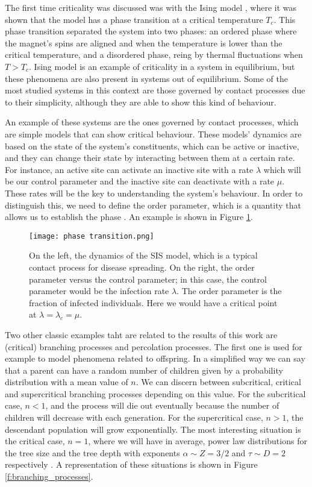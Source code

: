 The first time criticality was discussed was with the Ising model \cite{ising1925}, where it was shown that the model has a phase transition at a critical temperature $T_c$. This phase transition
separated the system into two phases: an ordered phase where the magnet's spins are aligned and when the temperature is lower than the critical temperature, and a disordered phase,
reing by thermal fluctuations when $T>T_c$. Ising model is an example of criticality in a system in equilibrium, but these phenomena are also present in systems out of equilibrium. 
Some of the most studied systems in this context are those governed by contact processes due to their simplicity, although they are able to show this kind of behaviour.

An example of these systems are the ones governed by contact processes, which are simple models that can show critical behaviour. These models' dynamics are based on the state of 
the system's constituents, which can be active or inactive, and they can change their state by interacting between them at a certain rate. For instance, an active site can activate
an inactive site with a rate $\lambda$ which will be our control parameter and the inactive site can deactivate with a rate $\mu$. 
These rates will be the key to understanding the system's behaviour. In order to distinguish this, we need to define the order parameter, which is a quantity that allows us to establish 
the phase \cite{wilting201925}. An example is shown in Figure \ref{f:order_parameter}.

\begin{figure}[H]
    \centering
    \texttt{[image: phase transition.png]}
    \caption{On the left, the dynamics of the SIS model, which is a typical contact process for disease spreading. On the right, the order parameter versus the control parameter; in this 
    case, the control parameter would be the infection rate $\lambda$. The order parameter is the fraction of infected individuals. Here we would have a critical point at $\lambda=\lambda_c
    =\mu$.}
    \label{f:order_parameter}
\end{figure}

Two other classic examples taht are related to the results of this work are (critical) branching processes and percolation processes. The first one is used for example to model phenomena 
related to offspring. In a simplified way we can say that a parent can have a random number of children given by a probability distribution with a mean value of $n$. We can discern between
subcritical, critical and supercritical branching processes depending on this value. For the subcritical case, $n<1$, and the process will die out eventually because the number of children
will decrease with each generation. For the supercritical case, $n>1$, the descendant population will grow exponentially. The most interesting situation is the critical case, $n=1$, where 
we will have in average, power law distributions for the tree size and the tree depth with exponents $\alpha\sim Z=3/2$ and $\tau\sim D=2$ respectively \cite{notarmuzi2021percolation}. A 
representation of these situations is shown in Figure \ref{f:branching_processes}.

